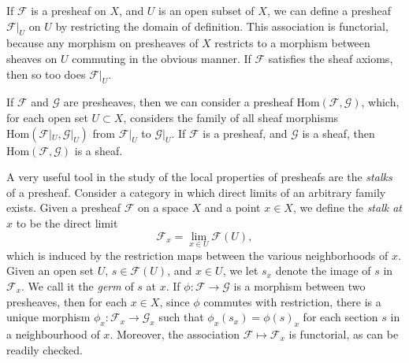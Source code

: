 \begin{example}
    If $\mathcal{F}$ is a presheaf on $X$, and $U$ is an open subset of $X$, we can define a presheaf $\mathcal{F}|_U$ on $U$ by restricting the domain of definition. This association is functorial, because any morphism on presheaves of $X$ restricts to a morphism between sheaves on $U$ commuting in the obvious manner. If $\mathcal{F}$ satisfies the sheaf axioms, then so too does $\mathcal{F}|_U$.
\end{example}

\begin{example}
    If $\mathcal{F}$ and $\mathcal{G}$ are presheaves, then we can consider a presheaf $\text{Hom}(\mathcal{F},\mathcal{G})$, which, for each open set $U \subset X$, considers the family of all sheaf morphisms $\text{Hom}(\mathcal{F}|_U, \mathcal{G}|_U)$ from $\mathcal{F}|_U$ to $\mathcal{G}|_U$. If $\mathcal{F}$ is a presheaf, and $\mathcal{G}$ is a sheaf, then $\text{Hom}(\mathcal{F},\mathcal{G})$ is a sheaf.
\end{example}

A very useful tool in the study of the local properties of presheafs are the \emph{stalks} of a presheaf. Consider a category in which direct limits of an arbitrary family exists. Given a presheaf $\mathcal{F}$ on a space $X$ and a point $x \in X$, we define the \emph{stalk at $x$} to be the direct limit
%
\[ \mathcal{F}_x = \lim_{x \in U} \mathcal{F}(U), \]
%
which is induced by the restriction maps between the various neighborhoods of $x$. Given an open set $U$, $s \in \mathcal{F}(U)$, and $x \in U$, we let $s_x$ denote the image of $s$ in $\mathcal{F}_x$. We call it the \emph{germ} of $s$ at $x$. If $\phi: \mathcal{F} \to \mathcal{G}$ is a morphism between two presheaves, then for each $x \in X$, since $\phi$ commutes with restriction, there is a unique morphism $\phi_x: \mathcal{F}_x \to \mathcal{G}_x$ such that $\phi_x(s_x) = \phi(s)_x$ for each section $s$ in a neighbourhood of $x$. Moreover, the association $\mathcal{F} \mapsto \mathcal{F}_x$ is functorial, as can be readily checked.

